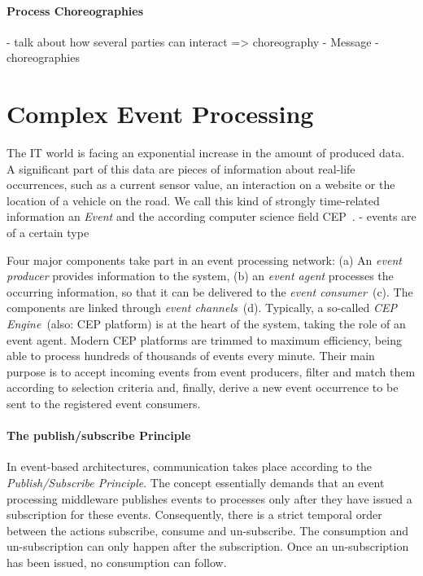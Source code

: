 
\paragraph{Process Choreographies}
- talk about how several parties can interact => choreography
- Message
- choreographies



\section{Complex Event Processing}
The IT world is facing an exponential increase in the amount of produced data. A significant part of this data are pieces of information about real-life occurrences, such as a current sensor value, an interaction on a website or the location of a vehicle on the road.
We call this kind of strongly time-related information an \textit{Event} and the according computer science field \ac{CEP}~\cite{evtprocessing}.
- events are of a certain type


Four major components take part in an event processing network: (a) An \textit{event producer} provides information to the system, (b) an \textit{event agent} processes the occurring information, so that it can be delivered to the \textit{event consumer}~(c). The components are linked through \textit{event channels}~(d).
Typically, a so-called \textit{\acs{CEP} Engine}~(also: CEP platform) is at the heart of the system, taking the role of an event agent.
Modern CEP platforms are trimmed to maximum efficiency, being able to process hundreds of thousands of events every minute.
Their main purpose is to accept incoming events from event producers, filter and match them according to selection criteria and, finally, derive a new event occurrence to be sent to the registered event consumers.

\paragraph{The publish/subscribe Principle}
In event-based architectures, communication takes place according to the \textit{Publish/Subscribe Principle}.
The concept essentially demands that an event processing middleware publishes events to processes only after they have issued a subscription for these events.
Consequently, there is a strict temporal order between the actions subscribe, consume and un-subscribe. The consumption and un-subscription can only happen after the subscription. Once an un-subscription has been issued, no consumption can follow.~\cite{tanenbaum:2007}


